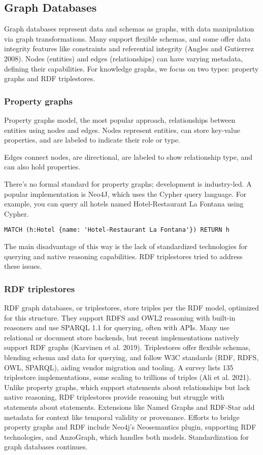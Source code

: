 \documentclass[12pt]{article}
\begin{document}
\subsection{Graph Databases}
Graph databases represent data and schemas as graphs, with data manipulation via graph transformations. Many support flexible schemas, and some offer data integrity features like constraints and referential integrity (Angles and Gutierrez 2008). Nodes (entities) and edges (relationships) can have varying metadata, defining their capabilities. For knowledge graphs, we focus on two types: property graphs and RDF triplestores. 
\subsubsection{Property graphs}
Property graphs model, the most popular approach, relationships between entities using nodes and edges. 
Nodes represent entities, can store key-value properties, and are labeled to indicate their role or type. 

Edges connect nodes, are directional, are labeled to show relationship type, and can also hold properties.

There’s no formal standard for property graphs; development is industry-led. A popular implementation is Neo4J, which uses the Cypher query language. For example, you can query all hotels named Hotel-Restaurant La Fontana using Cypher.
\begin{verbatim}
MATCH (h:Hotel {name: 'Hotel-Restaurant La Fontana'}) RETURN h
\end{verbatim}
The main disadvantage of this way is the lack of standardized technologies for querying and native reasoning capabilities. RDF triplestores tried to address these issues.
\subsubsection{RDF triplestores}
RDF graph databases, or triplestores, store triples per the RDF model, optimized for this structure. They support RDFS and OWL2 reasoning with built-in reasoners and use SPARQL 1.1 for querying, often with APIs. Many use relational or document store backends, but recent implementations natively support RDF graphs (Karvinen et al. 2019). Triplestores offer flexible schemas, blending schema and data for querying, and follow W3C standards (RDF, RDFS, OWL, SPARQL), aiding vendor migration and tooling. A survey lists 135 triplestore implementations, some scaling to trillions of triples (Ali et al. 2021). Unlike property graphs, which support statements about relationships but lack native reasoning, RDF triplestores provide reasoning but struggle with statements about statements. Extensions like Named Graphs and RDF-Star add metadata for context like temporal validity or provenance. Efforts to bridge property graphs and RDF include Neo4j's Neosemantics plugin, supporting RDF technologies, and AnzoGraph, which handles both models. Standardization for graph databases continues.
\end{document}
